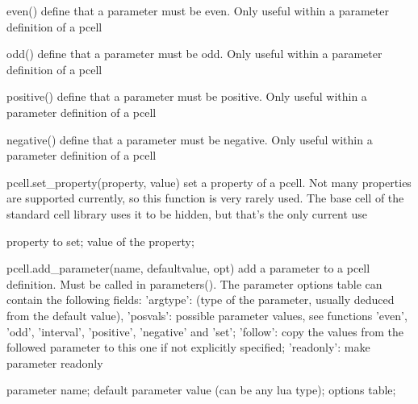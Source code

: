 \begin{APIfunc}{even()}
    define that a parameter must be even. Only useful within a parameter definition of a pcell
    \begin{APIparameters}
    \end{APIparameters}
\end{APIfunc}
\begin{APIfunc}{odd()}
    define that a parameter must be odd. Only useful within a parameter definition of a pcell
    \begin{APIparameters}
    \end{APIparameters}
\end{APIfunc}
\begin{APIfunc}{positive()}
    define that a parameter must be positive. Only useful within a parameter definition of a pcell
    \begin{APIparameters}
    \end{APIparameters}
\end{APIfunc}
\begin{APIfunc}{negative()}
    define that a parameter must be negative. Only useful within a parameter definition of a pcell
    \begin{APIparameters}
    \end{APIparameters}
\end{APIfunc}
\begin{APIfunc}{pcell.set\_property(property, value)}
    set a property of a pcell. Not many properties are supported currently, so this function is very rarely used. The base cell of the standard cell library uses it to be hidden, but that's the only current use
    \begin{APIparameters}
            property to set;
            value of the property;
    \end{APIparameters}
\end{APIfunc}
\begin{APIfunc}{pcell.add\_parameter(name, defaultvalue, opt)}
    add a parameter to a pcell definition. Must be called in parameters(). The parameter options table can contain the following fields: 'argtype': (type of the parameter, usually deduced from the default value), 'posvals': possible parameter values, see functions 'even', 'odd', 'interval', 'positive', 'negative' and 'set'; 'follow': copy the values from the followed parameter to this one if not explicitly specified; 'readonly': make parameter readonly
    \begin{APIparameters}
            parameter name;
            default parameter value (can be any lua type);
            options table;
    \end{APIparameters}
\end{APIfunc}
